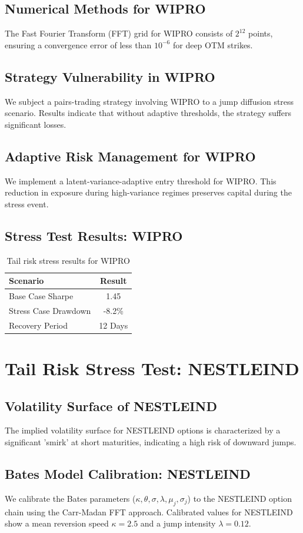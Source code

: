 \documentclass[12pt,a4paper,twoside]{article}
\begin{document}
\subsection{Numerical Methods for WIPRO}
The Fast Fourier Transform (FFT) grid for WIPRO consists of $2^{12}$ points, ensuring a convergence error of less than $10^{-6}$ for deep OTM strikes.
\subsection{Strategy Vulnerability in WIPRO}
We subject a pairs-trading strategy involving WIPRO to a jump diffusion stress scenario. Results indicate that without adaptive thresholds, the strategy suffers significant losses.
\subsection{Adaptive Risk Management for WIPRO}
We implement a latent-variance-adaptive entry threshold for WIPRO. This reduction in exposure during high-variance regimes preserves capital during the stress event.
\subsection{Stress Test Results: WIPRO}
\begin{table}[H]
\centering
\begin{tabular}{|l|c|}
\hline
Scenario & Result \\
\hline
Base Case Sharpe & 1.45 \\
Stress Case Drawdown & -8.2\% \\
Recovery Period & 12 Days \\
\hline
\end{tabular}
\caption{Tail risk stress results for WIPRO}
\end{table}
\newpage

\section{Tail Risk Stress Test: NESTLEIND}
\subsection{Volatility Surface of NESTLEIND}
The implied volatility surface for NESTLEIND options is characterized by a significant 'smirk' at short maturities, indicating a high risk of downward jumps.
\subsection{Bates Model Calibration: NESTLEIND}
We calibrate the Bates parameters ($\kappa, \theta, \sigma, \lambda, \mu_j, \sigma_j$) to the NESTLEIND option chain using the Carr-Madan FFT approach.
Calibrated values for NESTLEIND show a mean reversion speed $\kappa = 2.5$ and a jump intensity $\lambda = 0.12$.
\end{document}
